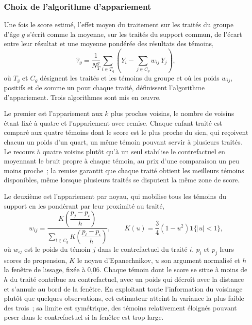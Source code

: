 \subsubsection{Choix de l'algorithme d'appariement}
Une fois le score estimé, l'effet moyen du traitement sur les traités du
groupe d'âge $g$ s'écrit comme la moyenne, sur les traités du support
commun, de l'écart entre leur résultat et une moyenne pondérée des
résultats des témoins,
\begin{equation}
  \hat{\tau}_g = \frac{1}{N_T^g} \sum_{i \in T_g}
  \left(Y_i - \sum_{j \in C_g} w_{ij}\, Y_j\right),
  \label{eq:att_algo}
\end{equation}
où $T_g$ et $C_g$ désignent les traités et les témoins du groupe et où les
poids $w_{ij}$, positifs et de somme un pour chaque traité, définissent
l'algorithme d'appariement. Trois algorithmes sont mis en œuvre.

Le premier est l'appariement aux $k$ plus proches voisins, le nombre de voisins étant fixé à quatre et l'appariement
avec remise. Chaque enfant traité est comparé aux quatre témoins dont le
score est le plus proche du sien, qui reçoivent chacun un poids d'un
quart, un même témoin pouvant servir à plusieurs traités. Le
recours à quatre voisins plutôt qu'à un seul stabilise le contrefactuel en
moyennant le bruit propre à chaque témoin, au prix d'une comparaison un
peu moins proche~; la remise garantit que chaque traité obtient les
meilleurs témoins disponibles, même lorsque plusieurs traités se disputent
la même zone de score.

Le deuxième est l'appariement par noyau, qui mobilise tous les témoins du
support en les pondérant par leur proximité au traité,
\begin{equation}
  w_{ij} = \frac{K\!\left(\dfrac{p_j - p_i}{h}\right)}
                {\sum_{l \in C_g} K\!\left(\dfrac{p_l - p_i}{h}\right)},
  \qquad
  K(u) = \frac{3}{4}\left(1 - u^2\right)\mathbf{1}\{|u| < 1\},
  \label{eq:kernel}
\end{equation}
où $w_{ij}$ est le poids du témoin $j$ dans le contrefactuel du traité
$i$, $p_i$ et $p_j$ leurs scores de propension, $K$ le noyau
d'Epanechnikov, $u$ son argument normalisé et $h$ la fenêtre de lissage,
fixée à 0,06. Chaque témoin dont le score se situe à moins de $h$ du traité
contribue au contrefactuel, avec un poids qui décroît avec la distance et
s'annule au bord de la fenêtre. En exploitant toute l'information du
voisinage plutôt que quelques observations, cet estimateur atteint la
variance la plus faible des trois~; sa limite est symétrique, des témoins
relativement éloignés pouvant peser dans le contrefactuel si la fenêtre
est trop large.

